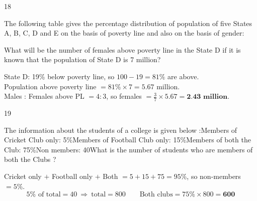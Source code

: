 \begin{question}{18}
{The following table gives the percentage distribution of population of five States A, B, C, D and E on the basis of poverty line and also on the basis of gender:\par}
What will be the number of females above poverty line in the State D if it is known that the population of State D is 7 million?
\begin{explain}
State D: 19\% below poverty line, so $100-19=81\%$ are above.\\
Population above poverty line $=81\%\times7=5.67$ million.\\
Males : Females above PL $=4:3$, so females $=\tfrac37\times5.67=\textbf{2.43 million}$.
\end{explain}
\end{question}

\begin{question}{19}
{The information about the students of a college is given below :\newline Members of Cricket Club only: 5\%\newline Members of Football Club only: 15\%\newline Members of both the Club: 75\%\newline Non members: 40\newline What is the number of students who are members of both the Clubs ?\par}
\begin{explain}
Cricket only $+$ Football only $+$ Both $=5+15+75=95\%$, so non-members $=5\%$.
\[5\%\text{ of total}=40\ \Rightarrow\ \text{total}=800\qquad \text{Both clubs}=75\%\times800=\mathbf{600}\]
\end{explain}
\end{question}

